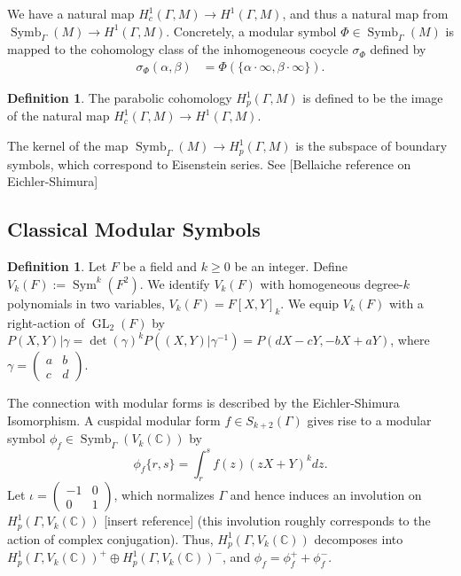 \documentclass[10pt]{amsart}
\theoremstyle{plain}
\theoremstyle{definition}
\newtheorem{definition}[theorem]{Definition}
\newcommand{\CC}{{\mathbb{C}}}
\newcommand{\cH}{\mathcal{H}}
\DeclareMathOperator{\GL}{GL}
\DeclareMathOperator{\Sym}{Sym}
\DeclareMathOperator{\Symb}{Symb}
\begin{document}


We have a natural map $H^1_c(\Gamma, M)\longrightarrow H^1(\Gamma,M)$, and thus a natural map from $\Symb_\Gamma(M)\longrightarrow H^1(\Gamma,M)$. Concretely, a modular symbol $\Phi\in \Symb_\Gamma(M)$ is mapped to the cohomology class of the inhomogeneous cocycle $\sigma_\Phi$ defined by
\begin{align}
\sigma_{\Phi}(\alpha, \beta) &= \Phi(\{\alpha \cdot \infty, \beta \cdot \infty\}).%
\end{align}
\begin{definition}
The parabolic cohomology $H^1_p(\Gamma,M)$ is defined to be the image of the natural map $H^1_c(\Gamma,M)\longrightarrow H^1(\Gamma,M)$.
\end{definition}
The kernel of the map $\Symb_\Gamma(M)\longrightarrow H^1_p(\Gamma,M)$ is the subspace of boundary symbols, which correspond to Eisenstein series. See [Bellaiche reference on Eichler-Shimura]



\subsection{Classical Modular Symbols}
\begin{definition}
Let $F$ be a field and $k\geq 0$ be an integer. Define $V_k(F):=\Sym^k(F^2)$. We identify $V_k(F)$ with homogeneous degree-$k$ polynomials in two variables, $V_k(F) = F[X,Y]_k$. We equip $V_k(F)$ with a right-action of $\GL_2(F)$ by $P(X,Y)|\gamma =\det(\gamma)^{k}P((X,Y)|\gamma^{-1})=P(dX-cY,-bX+aY)$, where $\gamma=\begin{pmatrix} a & b \\ c & d\end{pmatrix}$. 
\end{definition}
The connection with modular forms is described by the Eichler-Shimura Isomorphism. A cuspidal modular form $f\in S_{k+2}(\Gamma)$ gives rise to a modular symbol $\phi_{f}\in \Symb_{\Gamma} (V_k(\CC))$ by
\begin{equation*}
	\phi_{f} \{r, s\} = \int_r^s f(z) (zX+Y)^k dz.
\end{equation*}
Let $\iota = \begin{pmatrix} -1 & 0 \\ 0 & 1\end{pmatrix}$, which normalizes $\Gamma$ and hence induces an involution on $H^1_p(\Gamma, V_k(\CC))$ [insert reference] (this involution roughly corresponds to the action of complex conjugation). Thus, $H^1_p(\Gamma, V_k(\CC))$ decomposes into $H^1_p(\Gamma,V_k(\CC))^+\oplus H^1_p(\Gamma,V_k(\CC))^-$, and $\phi_f = \phi_f^+ + \phi_f^-$. 
\end{document}
